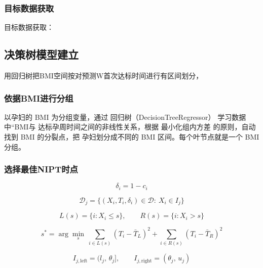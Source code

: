 \documentclass[withoutpreface,notoc]{cumcmthesis}
\begin{document}
	\subsubsection{目标数据获取}


	目标数据获取：


	\subsection{决策树模型建立}

	用回归树把BMI空间按对预测W首次达标时间进行有区间划分，

	\subsubsection{依据BMI进行分组}

	以孕妇的 BMI 为分组变量，通过 回归树（DecisionTreeRegressor） 学习数据中“BMI与
	达标孕周时间之间的非线性关系，根据 最小化组内方差 的原则，自动找到 BMI 的分裂点，把
	孕妇划分成不同的 BMI 区间。每个叶节点就是一个 BMI 分组。

	\subsubsection{选择最佳NIPT时点}




	\begin{equation*}  
		\delta_i = 1 - c_i
	\end{equation*}

	\begin{equation*}
		\mathcal{D}_j = \{(X_i,T_i,\delta_i)\in\mathcal{D}:\ X_i\in I_j\}
	\end{equation*}

	\begin{equation*}
		L(s)=\{i: X_i\le s\},\qquad R(s)=\{i: X_i> s\}
	\end{equation*}

	\begin{equation*}
		s^*=\arg\min_s\ \sum_{i\in L(s)}(T_i-\bar T_{L})^2 + \sum_{i\in R(s)}(T_i-\bar T_{R})^2
	\end{equation*}

	\begin{equation*}
		I_{j,\text{left}} = (l_j,\,\theta_j],\qquad I_{j,\text{right}} = (\theta_j,\,u_j)
	\end{equation*}
\end{document}
